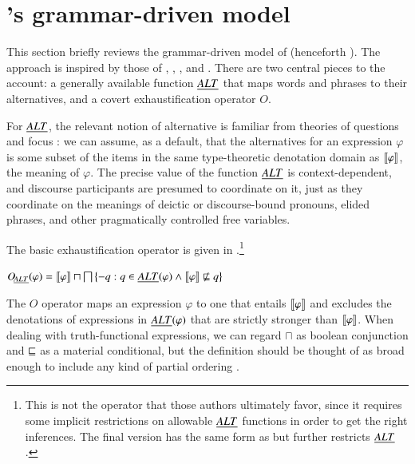 \documentclass[leqno,12pt]{article}
\begin{document}


\section{\CFS's grammar-driven model}\label{sec:cfs}

This section briefly reviews the grammar-driven model of
\citet{ChierchiaFoxSpector08} (henceforth \CFS).  The approach is
inspired by those of \citet{Chierchia01}, \citet{Sauerland01},
\citet{Spector:2007}, and \citet{Fox:2007,Fox:2009}. There are two
central pieces to the account: a generally available function $\emph{ALT}$
that maps words and phrases to their alternatives, and a covert
exhaustification operator $O$.

For $\emph{ALT}$, the relevant notion of alternative is familiar from
theories of questions and focus \citep{Groenendijk84,Rooth85,Rooth92}:
we can assume, as a default, that the alternatives for an expression
$\varphi$ is some subset of the items in the same type-theoretic
denotation domain as $\llbracket\varphi\rrbracket$, the meaning of $\varphi$. 
The precise value of the function $\emph{ALT}$ is context-dependent, and
discourse participants are presumed to coordinate on it, just as they
coordinate on the meanings of deictic or discourse-bound pronouns,
elided phrases, and other pragmatically controlled free variables.

The basic exhaustification operator is given in 
\citep{Spector:2007,Fox:2007,Fox:2009,Magri:2009,ChierchiaFoxSpector08}.\footnote{This
  is not the operator that those authors ultimately favor, since it
  requires some implicit restrictions on allowable $\emph{ALT}$ functions in
  order to get the right inferences.  The final version has the same
  form as  but further restricts $\emph{ALT}$.}
%
\begin{examples}
\item\label{def:O}
  $\OALT(\varphi) = 
  \sem{\varphi} \sqcap \bigsqcap\set{ -q : q \in \ALT(\varphi) \wedge \sem{\varphi} \not\entails q}$ 
\end{examples}
%
The $O$ operator maps an expression $\varphi$ to one that entails
$\llbracket\varphi\rrbracket$ and excludes the denotations of expressions in $\emph{ALT}(\varphi)$ that are strictly
stronger than $\llbracket\varphi\rrbracket$. When dealing with truth-functional
expressions, we can regard $\sqcap$ as boolean conjunction and
$\sqsubseteq$ as a material conditional, but the definition should be thought of
as broad enough to include any kind of partial ordering
.
\end{document}

